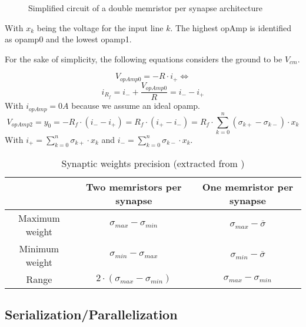 \begin{figure}[H]
  \centering
  
  \caption{Simplified circuit of a double memristor per synapse architecture}
  \label{circt:doubleMem}
\end{figure}

With $x_k$ being the voltage for the input line $k$. The highest \ac{opAmp} is identified as opamp0 and the lowest opamp1.

For the sake of simplicity, the following equations considers the ground to be $V_{cm}$.

\begin{equation}
  \label{eq:doubleMem0}
  V_{opAmp0}=-R\cdot i_+ \Leftrightarrow
\end{equation}
\begin{equation}
  \label{eq:doubleMem1}
  i_{R_f}=i_-+\frac{V_{opAmp0}}{R}=i_--i_+
\end{equation}
With $i_{opAmp}=0A$ because we assume an ideal \ac{opamp}.
\begin{equation}
  \label{eq:doubleMem2}
  V_{opAmp2}=y_0=-R_f\cdot(i_--i_+)=R_f\cdot(i_+-i_-)=R_f\cdot\sum_{k=0}^n(\sigma_{k+}-\sigma_{k-})\cdot x_k
\end{equation}
With $i_+=\sum_{k=0}^n\sigma_{k+}\cdot x_k$ and $i_-=\sum_{k=0}^n\sigma_{k-}\cdot x_k$.


\begin{table}[H]
  \centering
  \begin{tabular}{|c|c|c|}
    \cline{2-3}
    \rowcolor{gray}
    \multicolumn{1}{c|}{\cellcolor[HTML]{FFFFFF}} & Two memristors per synapse & One memristor per synapse \\
    \hline
    Maximum weight & $\sigma_{max}-\sigma_{min}$ & $\sigma_{max} -\overline{\sigma}$\\
    \hline
    Minimum weight & $\sigma_{min}-\sigma_{max}$ & $\sigma_{min} -\overline{\sigma}$\\
    \hline
    Range & $2\cdot(\sigma_{max}-\sigma_{min})$&$\sigma_{max}-\sigma_{min}$\\
    \hline
  \end{tabular}
  \caption{Synaptic weights precision (extracted from \cite{doubleMem})}
  \label{tab:synapses}
\end{table}

\subsection{Serialization/Parallelization}
\label{subsec:serpar}


